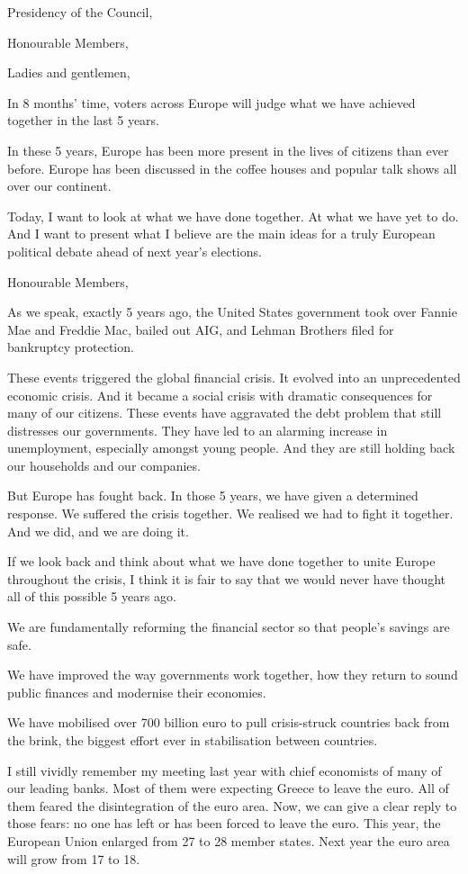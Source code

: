 \documentclass[a4paper,11pt]{article}
\begin{document}
Presidency of the Council,

Honourable Members,

Ladies and gentlemen,

In 8 months' time, voters across Europe will judge what we have achieved together in the last 5 years.

In these 5 years, Europe has been more present in the lives of citizens than ever before. Europe has been discussed in the coffee houses and popular talk shows all over our continent.

Today, I want to look at what we have done together. At what we have yet to do. And I want to present what I believe are the main ideas for a truly European political debate ahead of next year's elections.

Honourable Members,

As we speak, exactly 5 years ago, the United States government took over Fannie Mae and Freddie Mac, bailed out AIG, and Lehman Brothers filed for bankruptcy protection.

These events triggered the global financial crisis. It evolved into an unprecedented economic crisis. And it became a social crisis with dramatic consequences for many of our citizens. These events have aggravated the debt problem that still distresses our governments. They have led to an alarming increase in unemployment, especially amongst young people. And they are still holding back our households and our companies.

But Europe has fought back. In those 5 years, we have given a determined response. We suffered the crisis together. We realised we had to fight it together. And we did, and we are doing it.

If we look back and think about what we have done together to unite Europe throughout the crisis, I think it is fair to say that we would never have thought all of this possible 5 years ago.

We are fundamentally reforming the financial sector so that people's savings are safe.

We have improved the way governments work together, how they return to sound public finances and modernise their economies.

We have mobilised over 700 billion euro to pull crisis-struck countries back from the brink, the biggest effort ever in stabilisation between countries.

I still vividly remember my meeting last year with chief economists of many of our leading banks. Most of them were expecting Greece to leave the euro. All of them feared the disintegration of the euro area. Now, we can give a clear reply to those fears: no one has left or has been forced to leave the euro. This year, the European Union enlarged from 27 to 28 member states. Next year the euro area will grow from 17 to 18.
\end{document}
